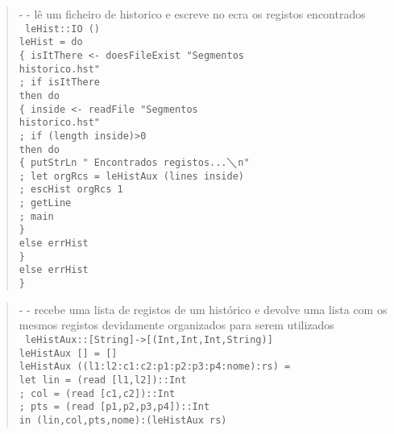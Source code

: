 \documentclass[a4paper,titlepage]{scrreprt}
\begin{document}
	\begin{quote}
		{\small - - lê um ficheiro de historico e escreve no ecra os registos encontrados\\}
		{\tt
		leHist::IO ()\\
		leHist = do\\
		\{ isItThere <- doesFileExist "Segmentos\\historico.hst"\\
		; if isItThere\\
		then do\\
		\{ inside <- readFile "Segmentos\\historico.hst"\\
		; if (length inside)>0\\
		then do\\
		\{ putStrLn " Encontrados registos...$\diagdown$n"\\
		; let orgRcs = leHistAux (lines inside)\\
		; escHist orgRcs 1\\
		; getLine\\
		; main\\
		\}\\
		else errHist\\
		\}\\
		else errHist\\
		\}
		}
	\end{quote}
	\begin{quote}
		{\small - - recebe uma lista de registos de um histórico e devolve uma lista com os mesmos registos devidamente organizados para serem utilizados\\}
		{\tt
		leHistAux::[String]->[(Int,Int,Int,String)]\\
		leHistAux [] = []\\
		leHistAux ((l1:l2:c1:c2:p1:p2:p3:p4:nome):rs) =\\
		let	lin = (read [l1,l2])::Int\\
		;	col = (read [c1,c2])::Int\\
		;	pts = (read [p1,p2,p3,p4])::Int\\
		in (lin,col,pts,nome):(leHistAux rs)
		}
	\end{quote}
\end{document}
